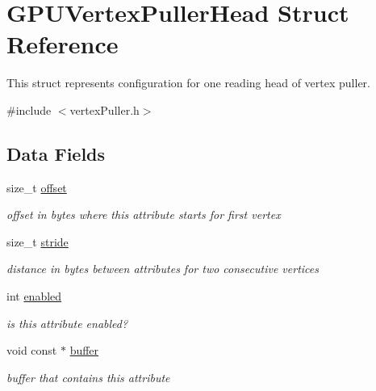 \hypertarget{structGPUVertexPullerHead}{}\section{G\+P\+U\+Vertex\+Puller\+Head Struct Reference}
\label{structGPUVertexPullerHead}


This struct represents configuration for one reading head of vertex puller.  




{\ttfamily \#include $<$vertex\+Puller.\+h$>$}

\subsection*{Data Fields}
\begin{DoxyCompactItemize}
\item 
size\+\_\+t \hyperlink{structGPUVertexPullerHead_a7131d0e0d5ec5e76c89459da5503fbeb}{offset}\hypertarget{structGPUVertexPullerHead_a7131d0e0d5ec5e76c89459da5503fbeb}{}\label{structGPUVertexPullerHead_a7131d0e0d5ec5e76c89459da5503fbeb}

\begin{DoxyCompactList}\small\item\em offset in bytes where this attribute starts for first vertex \end{DoxyCompactList}\item 
size\+\_\+t \hyperlink{structGPUVertexPullerHead_a9b48e3de1de5716c6e5e8ffa6fcc2753}{stride}\hypertarget{structGPUVertexPullerHead_a9b48e3de1de5716c6e5e8ffa6fcc2753}{}\label{structGPUVertexPullerHead_a9b48e3de1de5716c6e5e8ffa6fcc2753}

\begin{DoxyCompactList}\small\item\em distance in bytes between attributes for two consecutive vertices \end{DoxyCompactList}\item 
int \hyperlink{structGPUVertexPullerHead_af0e62aaa41d6d4e134fef1a02624a592}{enabled}\hypertarget{structGPUVertexPullerHead_af0e62aaa41d6d4e134fef1a02624a592}{}\label{structGPUVertexPullerHead_af0e62aaa41d6d4e134fef1a02624a592}

\begin{DoxyCompactList}\small\item\em is this attribute enabled? \end{DoxyCompactList}\item 
void const $\ast$ \hyperlink{structGPUVertexPullerHead_a7b348342bde17bc367d19e48e3476116}{buffer}\hypertarget{structGPUVertexPullerHead_a7b348342bde17bc367d19e48e3476116}{}\label{structGPUVertexPullerHead_a7b348342bde17bc367d19e48e3476116}

\begin{DoxyCompactList}\small\item\em buffer that contains this attribute \end{DoxyCompactList}\end{DoxyCompactItemize}


